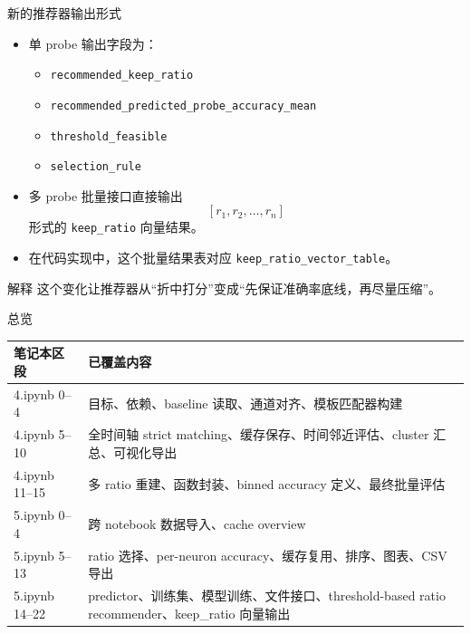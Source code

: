 \documentclass[aspectratio=169,11pt]{beamer}
\begin{document}
\begin{frame}{新的推荐器输出形式}
  \begin{itemize}
    \item 单 probe 输出字段为：
    \begin{itemize}
      \item \texttt{recommended\_keep\_ratio}
      \item \texttt{recommended\_predicted\_probe\_accuracy\_mean}
      \item \texttt{threshold\_feasible}
      \item \texttt{selection\_rule}
    \end{itemize}
    \item 多 probe 批量接口直接输出
    \[
      [r_1, r_2, \dots, r_n]
    \]
    形式的 \texttt{keep\_ratio} 向量结果。
    \item 在代码实现中，这个批量结果表对应
    \texttt{keep\_ratio\_vector\_table}。
  \end{itemize}
  \begin{alertblock}{解释}
    这个变化让推荐器从“折中打分”变成“先保证准确率底线，再尽量压缩”。
  \end{alertblock}
\end{frame}

\begin{frame}{总览}
  \small
  \begin{tabular}{>{\raggedright\arraybackslash}p{} >{\raggedright\arraybackslash}p{}}
    \toprule
    笔记本区段 & 已覆盖内容 \\
    \midrule
    4.ipynb 0--4 & 目标、依赖、baseline 读取、通道对齐、模板匹配器构建 \\
    4.ipynb 5--10 & 全时间轴 strict matching、缓存保存、时间邻近评估、cluster 汇总、可视化导出 \\
    4.ipynb 11--15 & 多 ratio 重建、函数封装、binned accuracy 定义、最终批量评估 \\
    5.ipynb 0--4 & 跨 notebook 数据导入、cache overview \\
    5.ipynb 5--13 & ratio 选择、per-neuron accuracy、缓存复用、排序、图表、CSV 导出 \\
    5.ipynb 14--22 & predictor、训练集、模型训练、文件接口、threshold-based ratio recommender、keep\_ratio 向量输出 \\
    \bottomrule
  \end{tabular}
\end{frame}
\end{document}
